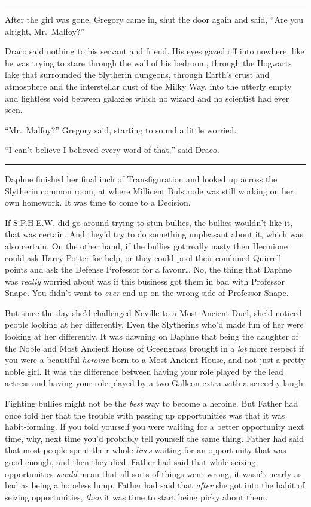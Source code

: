 \begin{center}\rule{3in}{0.4pt}\end{center}

After the girl was gone, Gregory came in, shut the door again and said,
``Are you alright, Mr.~Malfoy?''

Draco said nothing to his servant and friend. His eyes gazed off into
nowhere, like he was trying to stare through the wall of his bedroom,
through the Hogwarts lake that surrounded the Slytherin dungeons,
through Earth's crust and atmosphere and the interstellar dust of the
Milky Way, into the utterly empty and lightless void between galaxies
which no wizard and no scientist had ever seen.

``Mr.~Malfoy?'' Gregory said, starting to sound a little worried.

``I can't believe I believed every word of that,'' said Draco.

\begin{center}\rule{3in}{0.4pt}\end{center}

Daphne finished her final inch of Transfiguration and looked up across
the Slytherin common room, at where Millicent Bulstrode was still
working on her own homework. It was time to come to a Decision.

If S.P.H.E.W. did go around trying to stun bullies, the bullies wouldn't
like it, that was certain. And they'd try to do something unpleasant
about it, which was also certain. On the other hand, if the bullies got
really nasty then Hermione could ask Harry Potter for help, or they
could pool their combined Quirrell points and ask the Defense Professor
for a favour\ldots{} No, the thing that Daphne was \emph{really} worried
about was if this business got them in bad with Professor Snape. You
didn't want to \emph{ever} end up on the wrong side of Professor Snape.

But since the day she'd challenged Neville to a Most Ancient Duel, she'd
noticed people looking at her differently. Even the Slytherins who'd
made fun of her were looking at her differently. It was dawning on
Daphne that being the daughter of the Noble and Most Ancient House of
Greengrass brought in a \emph{lot} more respect if you were a beautiful
\emph{heroine} born to a Most Ancient House, and not just a pretty noble
girl. It was the difference between having your role played by the lead
actress and having your role played by a two-Galleon extra with a
screechy laugh.

Fighting bullies might not be the \emph{best} way to become a heroine.
But Father had once told her that the trouble with passing up
opportunities was that it was habit-forming. If you told yourself you
were waiting for a better opportunity next time, why, next time you'd
probably tell yourself the same thing. Father had said that most people
spent their whole \emph{lives} waiting for an opportunity that was good
enough, and then they died. Father had said that while seizing
opportunities \emph{would} mean that all sorts of things went wrong, it
wasn't nearly as bad as being a hopeless lump. Father had said that
\emph{after} she got into the habit of seizing opportunities,
\emph{then} it was time to start being picky about them.

